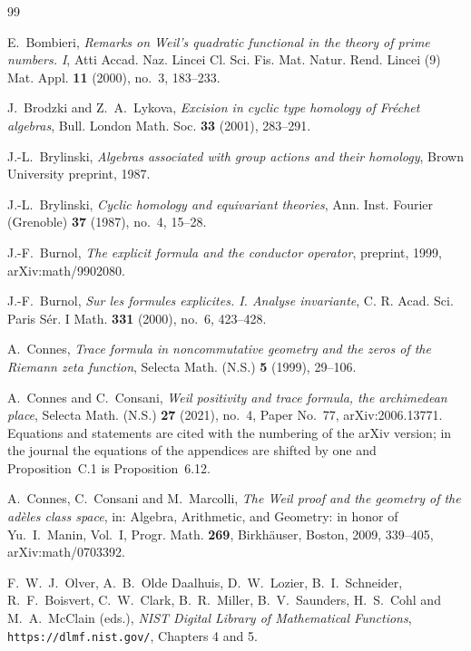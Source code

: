 \documentclass[11pt]{amsart}
\theoremstyle{definition}
\theoremstyle{remark}
\begin{document}
\begin{thebibliography}{99}

E.~Bombieri, \emph{Remarks on Weil's quadratic functional in the theory of
prime numbers. I}, Atti Accad. Naz. Lincei Cl. Sci. Fis. Mat. Natur. Rend.
Lincei (9) Mat. Appl. \textbf{11} (2000), no.~3, 183--233.

J.~Brodzki and Z.~A.~Lykova, \emph{Excision in cyclic type homology of
Fr\'echet algebras}, Bull. London Math. Soc. \textbf{33} (2001), 283--291.

J.-L.~Brylinski, \emph{Algebras associated with group actions and their
homology}, Brown University preprint, 1987.

J.-L.~Brylinski, \emph{Cyclic homology and equivariant theories}, Ann. Inst.
Fourier (Grenoble) \textbf{37} (1987), no.~4, 15--28.

J.-F.~Burnol, \emph{The explicit formula and the conductor operator},
preprint, 1999, arXiv:math/9902080.

J.-F.~Burnol, \emph{Sur les formules explicites. I. Analyse invariante},
C. R. Acad. Sci. Paris S\'er. I Math. \textbf{331} (2000), no.~6, 423--428.

A.~Connes, \emph{Trace formula in noncommutative geometry and the zeros of
the Riemann zeta function}, Selecta Math. (N.S.) \textbf{5} (1999), 29--106.

A.~Connes and C.~Consani, \emph{Weil positivity and trace formula, the
archimedean place}, Selecta Math. (N.S.) \textbf{27} (2021), no.~4, Paper
No.~77, arXiv:2006.13771.  Equations and statements are cited with the
numbering of the arXiv version; in the journal the equations of the
appendices are shifted by one and Proposition~C.1 is Proposition~6.12.

A.~Connes, C.~Consani and M.~Marcolli, \emph{The Weil proof and the geometry
of the ad\`eles class space}, in: Algebra, Arithmetic, and Geometry: in honor
of Yu.~I.~Manin, Vol.~I, Progr. Math. \textbf{269}, Birkh\"auser, Boston,
2009, 339--405, arXiv:math/0703392.

F.~W.~J.~Olver, A.~B.~Olde Daalhuis, D.~W.~Lozier, B.~I.~Schneider,
R.~F.~Boisvert, C.~W.~Clark, B.~R.~Miller, B.~V.~Saunders, H.~S.~Cohl and
M.~A.~McClain (eds.), \emph{NIST Digital Library of Mathematical Functions},
\texttt{https://dlmf.nist.gov/}, Chapters 4 and 5.


\end{thebibliography}
\end{document}
